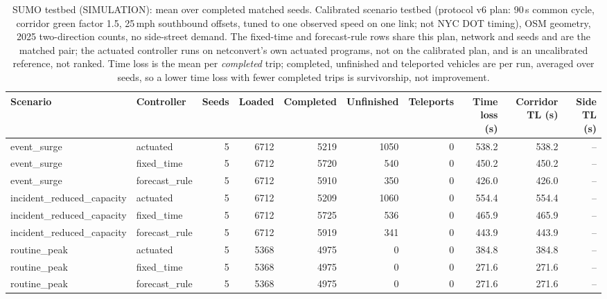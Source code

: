 \begin{table}[t]\centering\caption{SUMO testbed (SIMULATION): mean over completed matched seeds. Calibrated scenario testbed (protocol v6 plan: 90\,s common cycle, corridor green factor 1.5, 25\,mph southbound offsets, tuned to one observed speed on one link; not NYC DOT timing), OSM geometry, 2025 two-direction counts, no side-street demand. The fixed-time and forecast-rule rows share this plan, network and seeds and are the matched pair; the actuated controller runs on netconvert's own actuated programs, not on the calibrated plan, and is an uncalibrated reference, not ranked. Time loss is the mean per \emph{completed} trip; completed, unfinished and teleported vehicles are per run, averaged over seeds, so a lower time loss with fewer completed trips is survivorship, not improvement.}\label{tab:sim}
\begin{tabular}{llrrrrrrrr}\toprule Scenario & Controller & Seeds & Loaded & Completed & Unfinished & Teleports & Time loss (s) & Corridor TL (s) & Side TL (s) \\ \midrule
event\_surge & actuated & 5 & 6712 & 5219 & 1050 & 0 & 538.2 & 538.2 & -- \\
event\_surge & fixed\_time & 5 & 6712 & 5720 & 540 & 0 & 450.2 & 450.2 & -- \\
event\_surge & forecast\_rule & 5 & 6712 & 5910 & 350 & 0 & 426.0 & 426.0 & -- \\
incident\_reduced\_capacity & actuated & 5 & 6712 & 5209 & 1060 & 0 & 554.4 & 554.4 & -- \\
incident\_reduced\_capacity & fixed\_time & 5 & 6712 & 5725 & 536 & 0 & 465.9 & 465.9 & -- \\
incident\_reduced\_capacity & forecast\_rule & 5 & 6712 & 5919 & 341 & 0 & 443.9 & 443.9 & -- \\
routine\_peak & actuated & 5 & 5368 & 4975 & 0 & 0 & 384.8 & 384.8 & -- \\
routine\_peak & fixed\_time & 5 & 5368 & 4975 & 0 & 0 & 271.6 & 271.6 & -- \\
routine\_peak & forecast\_rule & 5 & 5368 & 4975 & 0 & 0 & 271.6 & 271.6 & -- \\
\bottomrule\end{tabular}\end{table}
